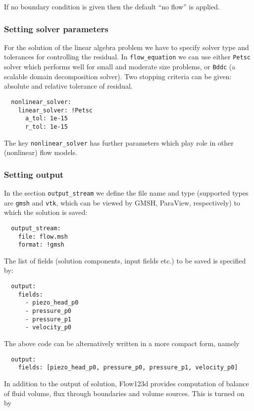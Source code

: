 If no boundary condition is given then the default ``no flow'' is
applied.

\subsubsection{Setting solver parameters}

For the solution of the linear algebra problem we have to specify solver
type and tolerances for controlling the residual. In
\texttt{flow\_equation} we can use either \texttt{Petsc} solver which
performs well for small and moderate size problems, or \texttt{Bddc} (a
scalable domain decomposition solver). Two stopping criteria can be
given: absolute and relative tolerance of residual.

\begin{verbatim}
  nonlinear_solver:
    linear_solver: !Petsc
      a_tol: 1e-15
      r_tol: 1e-15
\end{verbatim}

The key \texttt{nonlinear\_solver} has further parameters which play
role in other (nonlinear) flow models.

\subsubsection{Setting output}

In the section \texttt{output\_stream} we define the file name and type
(supported types are \texttt{gmsh} and \texttt{vtk}, which can be viewed
by GMSH, ParaView, respectively) to which the solution is saved:

\begin{verbatim}
  output_stream:
    file: flow.msh
    format: !gmsh
\end{verbatim}

The list of fields (solution components, input fields etc.) to be saved
is specified by:

\begin{verbatim}
  output:
    fields:
      - piezo_head_p0
      - pressure_p0
      - pressure_p1
      - velocity_p0
\end{verbatim}

The above code can be alternatively written in a more compact form,
namely

\begin{verbatim}
  output:
    fields: [piezo_head_p0, pressure_p0, pressure_p1, velocity_p0]
\end{verbatim}

In addition to the output of solution, Flow123d provides computation of
balance of fluid volume, flux through boundaries and volume sources.
This is turned on by

